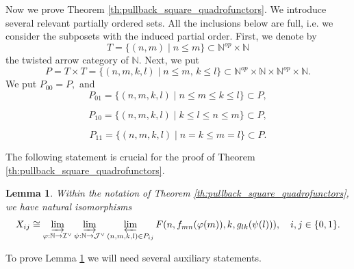 \documentclass[11pt,leqno]{amsart}
\newtheorem{lemma}[theo]{Lemma}
\numberwithin{equation}{section}
\def\N{\mathbb{N}}
\newcommand{\indlim}[1][]{\mathop{\varinjlim}\limits_{#1}}
\newcommand{\prolim}[1][]{\mathop{\varprojlim}\limits_{#1}}
\newcommand{\cJ}{{\mathcal J}}
\newcommand{\cI}{{\mathcal I}}
\begin{document}
Now we prove Theorem \ref{th:pullback_square_quadrofunctors}. We introduce several relevant partially ordered sets. All the inclusions below are full, i.e. we consider the subposets with the induced partial order.
First, we denote by 
\begin{equation}\label{eq:twisted_arrow_of_N}
T = \{(n,m)\mid n\leq m\}\subset \N^{op}\times\N
\end{equation}
the twisted arrow category of $\N.$ Next, we put
\begin{equation*}
P = T\times T =\{(n,m,k,l)\mid n\leq m,\, k\leq l\}\subset\N^{op}\times\N\times\N^{op}\times\N.
\end{equation*}
We put $P_{00}=P,$ and
\begin{equation}\label{eq:poset_S_01}
P_{01} = \{(n,m,k,l)\mid n\leq m\leq k\leq l\}\subset P,
\end{equation} 

\begin{equation*}
P_{10} = \{(n,m,k,l)\mid k\leq l\leq n\leq m\}\subset P,
\end{equation*}

\begin{equation*}
P_{11} = \{(n,m,k,l)\mid n=k\leq m=l\}\subset P.
\end{equation*}

The following statement is crucial for the proof of Theorem \ref{th:pullback_square_quadrofunctors}.

\begin{lemma}\label{lem:rewriting_X_ij} Within the notation of Theorem \ref{th:pullback_square_quadrofunctors}, we have natural isomorphisms
\begin{equation}\label{eq:rewriting_X_ij}
X_{ij}\cong \indlim[\varphi:\N\to\cI^{\vee}]\indlim[\psi:\N\to\cJ^{\vee}]\prolim[(n,m,k,l)\in P_{ij}] F(n,f_{mn}(\varphi(m)),k,g_{lk}(\psi(l))),\quad i,j\in \{0,1\}.
\end{equation}
\end{lemma}

To prove Lemma \ref{lem:rewriting_X_ij} we will need several auxiliary statements.
\end{document}
